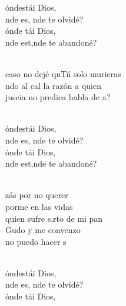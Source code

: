 \documentclass[12pt]{article}
\begin{document}
\begin{multicols*}{2}
\begin{cancion}%
	\begin{chorus}%
	óndestái Dios, \\
	nde es, nde te olvidé?  \\
	ónde tái Dios, \\
	nde est,nde te abandoné?  \\
	\end{chorus}%
	\jump\\
	caso no dejé quTú solo murieras\\
	ndo al cal la razón a quien\\
	juscia no predica habla de a?\\\jump\\
	\begin{chorus}%
	óndestái Dios, \\
	nde es, nde te olvidé?  \\
	ónde tái Dios, \\
	nde est,nde te abandoné?  \\
	\end{chorus}%
	\jump\\
	zás por no querer \\
	porme en las vidas\\
	quien sufre s,rto de mi pan\\
	Gudo y me convenzo \\
	 no puedo hacer s\\\jump\\
	\begin{chorus}%
	óndestái Dios, \\
	nde es, nde te olvidé?  \\
	ónde tái Dios, \\

\end{chorus}
\end{cancion}
\end{multicols*}
\end{document}
